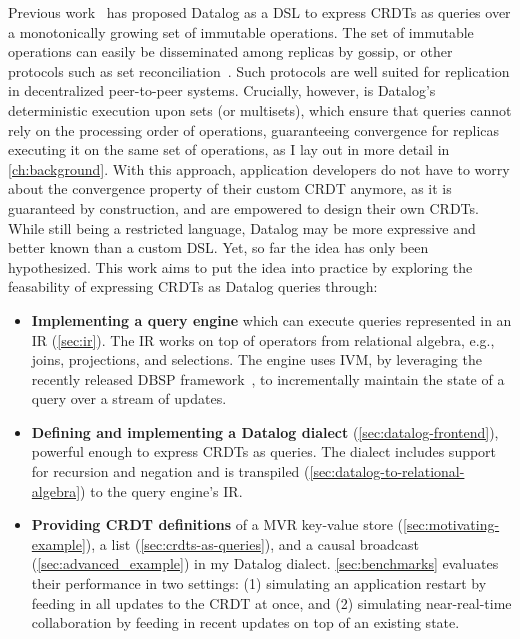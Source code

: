 Previous work~\cite{kleppmann2018data} has proposed Datalog as a \ac{DSL}
to express \acp{CRDT} as queries over a monotonically growing set of
immutable operations.
The set of immutable operations can easily be disseminated among replicas
by gossip, or other protocols such as set reconciliation~\cite{TODO}.
Such protocols are well suited for replication in decentralized peer-to-peer systems.
Crucially, however, is  Datalog's deterministic execution upon sets (or multisets),
which ensure that queries cannot rely on the processing order of operations,
guaranteeing convergence for replicas executing it on the same set of operations,
as I lay out in more detail in \autoref{ch:background}.
With this approach, application developers do not have to worry about
the convergence property of their custom \ac{CRDT} anymore,
as it is guaranteed by construction, and are empowered to design their own \acp{CRDT}.
While still being a restricted language, Datalog may be more expressive
and better known than a custom \ac{DSL}.
Yet, so far the idea has only been hypothesized.
This work aims to put the idea into practice by exploring the feasability of
expressing \acp{CRDT} as Datalog queries through:

\begin{itemize}
	\item \textbf{Implementing a query engine} which can execute queries
	      represented in an \ac{IR} (\ref{sec:ir}).
	      The \ac{IR} works on top of operators from relational algebra, e.g.,
	      joins, projections, and selections.
	      The engine uses \ac{IVM}, by leveraging the recently released DBSP
	      framework~\cite{budiu2025dbsp}, to incrementally maintain the state
	      of a query over a stream of updates.
	\item \textbf{Defining and implementing a Datalog dialect} (\ref{sec:datalog-frontend}),
	      powerful enough to express \acp{CRDT} as queries.
	      The dialect includes support for recursion and negation
	      and is transpiled (\ref{sec:datalog-to-relational-algebra})
	      to the query engine's \ac{IR}.
	\item \textbf{Providing \ac{CRDT} definitions} of
	      a \ac{MVR} key-value store (\ref{sec:motivating-example}),
	      a list (\ref{sec:crdts-as-queries}),
	      and a causal broadcast (\ref{sec:advanced_example}) in my Datalog dialect.
	      \ref{sec:benchmarks} evaluates their performance in two settings:
	      (1) simulating an application restart by feeding in all updates to
	      the \ac{CRDT} at once, and (2) simulating near-real-time collaboration
	      by feeding in recent updates on top of an existing state.
\end{itemize}

